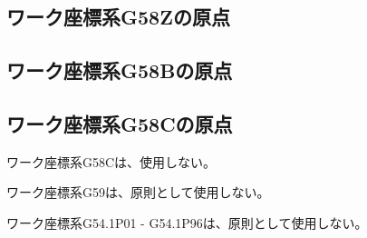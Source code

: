 \subsection{ワーク座標系{\ttfamily G58Z}の原点\TBW}


\subsection{ワーク座標系{\ttfamily G58B}の原点\TBW}


\subsection{ワーク座標系{\ttfamily G58C}の原点}
ワーク座標系{\ttfamily G58C}は、使用しない。



\clearpage
ワーク座標系{\ttfamily G59}は、原則として使用しない。



ワーク座標系{\ttfamily G54.1\;P01} - {\ttfamily G54.1\;P96}は、原則として使用しない。


